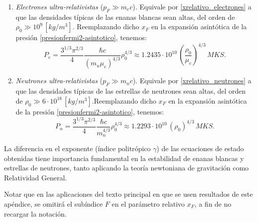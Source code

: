 \begin{enumerate}
\begin{enumerate}
\item \emph{Electrones ultra-relativistas} ($p_F\gg m_{e}c$). Equivale por  \eqref{xrelativo_electrones} a que las densidades típicas de las enanas blancas sean altas, del orden de $\rho_0\gg10^{9}\,[kg/m^3]$. Reemplazando dicho $x_F$ en la expansión asintótica de la presión \eqref{presionfermi2-asintotico}, tenemos:
\begin{equation}\label{fermi_relativista}
 \boxed{P_e=\frac{3^{1/3}\pi^{2/3}}{4}\frac{\hbar c}{(m_u\mu_e)^{4/3}}\rho_0^{4/3}\approx1.2435\cdot 10^{10}\,\left(\frac{\rho_0}{\mu_e}\right)^{4/3}\,MKS.}
\end{equation}

\item \emph{Neutrones ultra-relativistas} ($p_F\gg m_{n}c$). Equivale por  \eqref{xrelativo_neutrones} a que las densidades típicas de las estrellas de neutrones sean altas, del orden de $\rho_0\gg6\cdot10^{18}\,[kg/m^3]$.Reemplazando dicho $x_F$ en la expansión asintótica de la presión \eqref{presionfermi2-asintotico}, tenemos:
\begin{equation}\label{fermi_relativista2}
 \boxed{P_n=\frac{3^{1/3}\pi^{2/3}}{4}\frac{\hbar c}{m_n^{4/3}}\rho_0^{4/3}\approx1.2293\cdot 10^{10}\,\left(\rho_0\right)^{4/3}\,MKS.}
\end{equation}

\end{enumerate}
\end{enumerate}

La diferencia en el exponente (índice politrópico $\gamma$) de las ecuaciones de estado obtenidas tiene importancia fundamental en la estabilidad de enanas blancas y estrellas de neutrones, tanto aplicando la teoría newtoniana de gravitación como Relatividad General.

Notar que en las aplicaciones del texto principal en que se usen resultados de este apéndice, se omitirá el subíndice $F$ en el parámetro relativo $x_F$, a fin de no recargar la notación.
